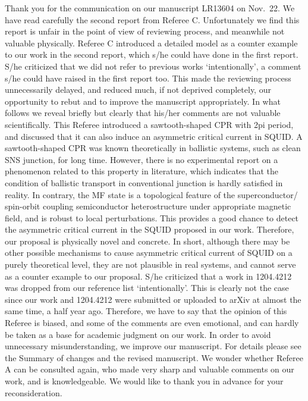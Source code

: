 \documentclass[11pt]{article}
\begin{document}
Thank you for the communication on our manuscript LR13604 on Nov.~22. We
have read carefully the second report from Referee C. Unfortunately we
find this report is unfair in the point of view of reviewing process,
and meanwhile not valuable physically. Referee C introduced a detailed
model as a counter example to our work in the second report, which s/he
could have done in the first report. S/he criticized that we did not
refer to previous works `intentionally', a comment s/he could have
raised in the first report too. This made the reviewing process
unnecessarily delayed, and reduced much, if not deprived completely, our
opportunity to rebut and to improve the manuscript appropriately. In
what follows we reveal briefly but clearly that his/her comments are not
valuable scientifically. This Referee introduced a sawtooth-shaped CPR
with 2pi period, and discussed that it can also induce an asymmetric
critical current in SQUID. A sawtooth-shaped CPR was known theoretically
in ballistic systems, such as clean SNS junction, for long time.
However, there is no experimental report on a phenomenon related to this
property in literature, which indicates that the condition of ballistic
transport in conventional junction is hardly satisfied in reality. In
contrary, the MF state is a topological feature of the superconductor/
spin-orbit coupling semiconductor heterostructure under appropriate
magnetic field, and is robust to local perturbations. This provides a
good chance to detect the asymmetric critical current in the SQUID
proposed in our work. Therefore, our proposal is physically novel and
concrete. In short, although there may be other possible mechanisms to
cause asymmetric critical current of SQUID on a purely theoretical
level, they are not plausible in real systems, and cannot serve as a
counter example to our proposal. S/he criticized that a work in
1204.4212 was dropped from our reference list `intentionally'. This is
clearly not the case since our work and 1204.4212 were submitted or
uploaded to arXiv at almost the same time, a half year ago. Therefore,
we have to say that the opinion of this Referee is biased, and some of
the comments are even emotional, and can hardly be taken as a base for
academic judgment on our work. In order to avoid unnecessary
misunderstanding, we improve our manuscript. For details please see the
Summary of changes and the revised manuscript. We wonder whether Referee
A can be consulted again, who made very sharp and valuable comments on
our work, and is knowledgeable. We would like to thank you in advance
for your reconsideration.
\end{document}
